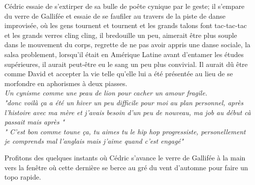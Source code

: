 \documentclass{article}
\begin{document}
 \setlength{\columnsep}{4em}
\begin{paracol}{2}
Cédric essaie
de s'extirper de sa bulle de poête cynique par le geste; il s'empare du
verre de Gallifée et essaie de se faufiler au travers de la piste de danse
improvisée, où les gens tournent et tournent et les grands talons font
tac-tac-tac et les grands verres cling cling, il bredouille un peu, aimerait
être plus souple dans le mouvement du corps, regrette de ne pas avoir appris
une danse sociale, la salsa problement, lorsqu'il était en Amérique Latine
avant d'entamer les études supérieures, il aurait peut-être eu le sang un
peu plus convivial. Il aurait dû être comme David et accepter la vie telle
qu'elle lui a été présentée au lieu de se morfondre en aphorismes à deux
piasses.\\

\emph{Un cynisme comme une peau de lion pour cacher un amour fragile.}\\
\switchcolumn
{} \phantom{}
\small
\textit{"\textelp{}donc voilà ça a été un hiver un peu difficile pour moi au
    plan personnel, après l'histoire avec ma mère et j'avais besoin d'un peu de
    nouveau, ma job au début cà passait mais après \textelp{}"\\[1em]
    "\textelp{} C'est bon comme toune ça, tu aimes tu le hip hop progressiste,
    personellement je comprends mal l'anglais mais j'aime quand c'est engagé"}
\end{paracol}

Profitons des quelques
instants où Cédric s'avance le verre de Gallifée à la main vers
la fenêtre où cette dernière se berce au gré du vent d'automne pour faire un topo
rapide.
\end{document}
